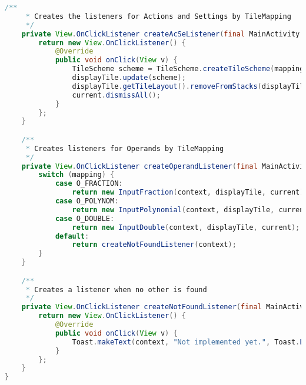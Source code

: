 \begin{lstlisting}[caption=InputMenuFactory,label=list:InputMenuFactory,language=Java]
    /**
     * Creates the listeners for Actions and Settings by TileMapping
     */
    private View.OnClickListener createAcSeListener(final MainActivity context, final TileMapping mapping) {
        return new View.OnClickListener() {
            @Override
            public void onClick(View v) {
                TileScheme scheme = TileScheme.createTileScheme(mapping, mapping.getMenuText());
                displayTile.update(scheme);
                displayTile.getTileLayout().removeFromStacks(displayTile);
                current.dismissAll();
            }
        };
    }

    /**
     * Creates listeners for Operands by TileMapping
     */
    private View.OnClickListener createOperandListener(final MainActivity context, TileMapping mapping) {
        switch (mapping) {
            case O_FRACTION:
                return new InputFraction(context, displayTile, current);
            case O_POLYNOM:
                return new InputPolynomial(context, displayTile, current);
            case O_DOUBLE:
                return new InputDouble(context, displayTile, current);
            default:
                return createNotFoundListener(context);
        }
    }

    /**
     * Creates a listener when no other is found
     */
    private View.OnClickListener createNotFoundListener(final MainActivity context) {
        return new View.OnClickListener() {
            @Override
            public void onClick(View v) {
                Toast.makeText(context, "Not implemented yet.", Toast.LENGTH_SHORT).show();
            }
        };
    }
}
\end{lstlisting}    

